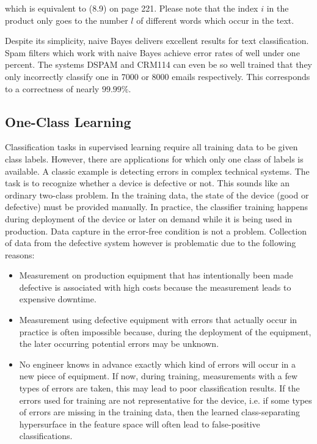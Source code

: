 \documentclass[10pt]{article}
\begin{document}
which is equivalent to (8.9) on page 221. Please note that the index $i$ in the product only goes to the number $l$ of different words which occur in the text.

Despite its simplicity, naive Bayes delivers excellent results for text classification. Spam filters which work with naive Bayes achieve error rates of well under one percent. The systems DSPAM and CRM114 can even be so well trained that they only incorrectly classify one in 7000 or 8000 emails respectively. This corresponds to a correctness of nearly $99.99 \%$.

\subsection*{One-Class Learning}
Classification tasks in supervised learning require all training data to be given class labels. However, there are applications for which only one class of labels is available. A classic example is detecting errors in complex technical systems. The task is to recognize whether a device is defective or not. This sounds like an ordinary two-class problem. In the training data, the state of the device (good or defective) must be provided manually. In practice, the classifier training happens during deployment of the device or later on demand while it is being used in production. Data capture in the error-free condition is not a problem. Collection of data from the defective system however is problematic due to the following reasons:

\begin{itemize}
  \item Measurement on production equipment that has intentionally been made defective is associated with high costs because the measurement leads to expensive downtime.
  \item Measurement using defective equipment with errors that actually occur in practice is often impossible because, during the deployment of the equipment, the later occurring potential errors may be unknown.
  \item No engineer knows in advance exactly which kind of errors will occur in a new piece of equipment. If now, during training, measurements with a few types of errors are taken, this may lead to poor classification results. If the errors used for training are not representative for the device, i.e. if some types of errors are missing in the training data, then the learned class-separating hypersurface in the feature space will often lead to false-positive classifications.
\end{itemize}
\end{document}
